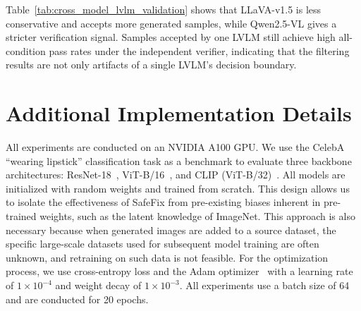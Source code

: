 \documentclass[10pt]{article} %
\newcommand{\qwen}{Qwen2.5-VL\xspace}
\newcommand{\llava}{LLaVA-v1.5\xspace}
\begin{document}
Table~\ref{tab:cross_model_lvlm_validation} shows that \llava{} is less conservative and accepts more generated samples, while \qwen{} gives a stricter verification signal. Samples accepted by one LVLM still achieve high all-condition pass rates under the independent verifier, indicating that the filtering results are not only artifacts of a single LVLM's decision boundary.



\section{Additional Implementation Details} 
All experiments are conducted on an NVIDIA A100 GPU\@. We use the CelebA ``wearing lipstick'' classification task as a benchmark to evaluate three backbone architectures: ResNet-18~\citep{he2016deep}, ViT-B/16~\citep{dosovitskiy2020vit}, and CLIP (ViT-B/32)~\citep{radford2021learning}. All models are initialized with random weights and trained from scratch. This design allows us to isolate the effectiveness of SafeFix from pre-existing biases inherent in pre-trained weights, such as the latent knowledge of ImageNet. This approach is also necessary because when generated images are added to a source dataset, the specific large-scale datasets used for subsequent model training are often unknown, and retraining on such data is not feasible. For the optimization process, we use cross-entropy loss and the Adam optimizer~\citep{kingma2015adam} with a learning rate of $1\times10^{-4}$ and weight decay of $1\times10^{-3}$. All experiments use a batch size of 64 and are conducted for 20 epochs.
\end{document}

